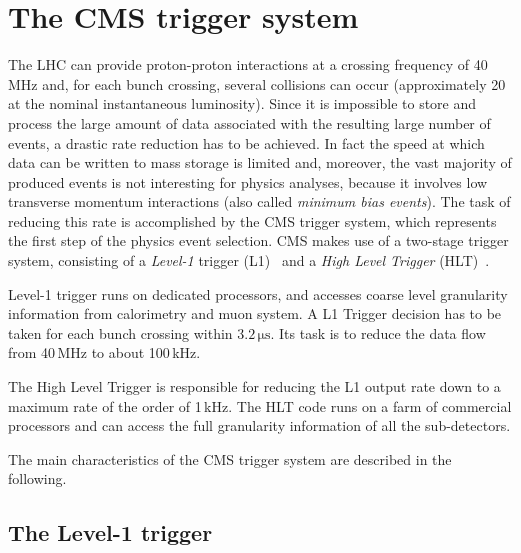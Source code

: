 \section{The CMS trigger system}
\label{sec:Trigger}

The LHC can provide proton-proton interactions at a crossing frequency of 40\,MHz and, for each bunch crossing, several collisions can occur (approximately 20 at the nominal instantaneous luminosity). Since it is impossible to store and process the large amount of data associated with the resulting large number of events, a drastic rate reduction has to be achieved. In fact the speed at which data can be written to mass storage is limited and, moreover, the vast majority of produced events is not interesting for physics analyses, because it involves low transverse momentum interactions (also called \emph{minimum bias events}). The task of reducing this rate is accomplished by the CMS trigger system, which represents the first step of the physics event selection. CMS makes use of a two-stage trigger system, consisting of a \emph{Level-1} trigger (L1)~\cite{Dasu:2000ge} and a \emph{High Level Trigger} (HLT)~\cite{Cittolin:578006}.

Level-1 trigger runs on dedicated processors, and accesses coarse level granularity information from calorimetry and muon system. A L1 Trigger decision has to be taken for each bunch crossing within $3.2\,\mathrm{\mu s}$. Its task is to reduce the data flow from 40\,MHz to about 100\,kHz.

The High Level Trigger is responsible for reducing the L1 output rate down to a maximum rate of the order of 1\,kHz. The HLT code runs on a farm of commercial processors and can access the full granularity information of all the sub-detectors.

The main characteristics of the CMS trigger system are described in the following.

\subsection{The Level-1 trigger}

